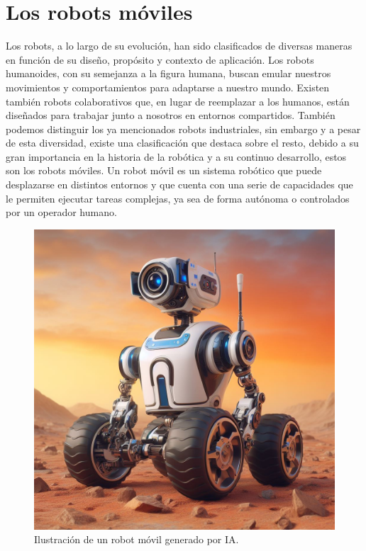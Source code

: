 \section{Los robots móviles }
\label{sec:Los_robots_móviles}

Los robots, a lo largo de su evolución, han sido clasificados de diversas maneras en función de su diseño, propósito y contexto de aplicación. Los robots humanoides, con su semejanza a la figura humana, buscan emular nuestros movimientos y comportamientos para adaptarse a nuestro mundo. Existen también robots colaborativos que, en lugar de reemplazar a los humanos, están diseñados para trabajar junto a nosotros en entornos compartidos. También podemos distinguir los ya mencionados robots industriales, sin embargo y a pesar de esta diversidad, existe una clasificación que destaca sobre el resto, debido a su gran importancia en la historia de la robótica y a su continuo desarrollo, estos son los robots móviles. Un robot móvil es un sistema robótico que puede desplazarse en distintos entornos y que cuenta con una serie de capacidades que le permiten ejecutar tareas complejas, ya sea de forma autónoma o controlados por un operador humano. \cite{los-robots-móviles}

\bigskip

\begin{figure}[h] 
    \centering
    \includegraphics[width=0.7\linewidth]{imagenes/cap1/robot_movil.png} 
    \caption{Ilustración de un robot móvil generado por \acs{IA}.}
    \label{fig:Ilustración de un robot móvil generado por IA} 
\end{figure}

\bigskip


